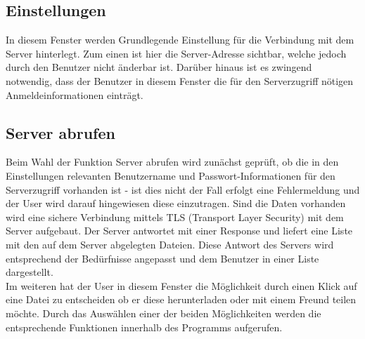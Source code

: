 \documentclass[10pt, a4paper,headsepline]{scrreprt}
\begin{document}
\subsection{Einstellungen}
In diesem Fenster werden Grundlegende Einstellung für die Verbindung mit dem Server hinterlegt. Zum einen ist hier die Server-Adresse sichtbar, welche jedoch durch den Benutzer nicht änderbar ist. Darüber hinaus ist es zwingend notwendig, dass der Benutzer in diesem Fenster die für den Serverzugriff nötigen Anmeldeinformationen einträgt.


\subsection{Server abrufen}
Beim Wahl der Funktion Server abrufen wird zunächst geprüft, ob die in den Einstellungen relevanten Benutzername und Passwort-Informationen für den Serverzugriff vorhanden ist - ist dies nicht der Fall erfolgt eine Fehlermeldung und der User wird darauf hingewiesen diese einzutragen. Sind die Daten vorhanden wird eine sichere Verbindung mittels TLS (Transport Layer Security) mit dem Server aufgebaut. Der Server antwortet mit einer Response und liefert eine Liste mit den auf dem Server abgelegten Dateien. Diese Antwort des Servers wird entsprechend der Bedürfnisse angepasst und dem Benutzer in einer Liste dargestellt. \\
Im weiteren hat der User in diesem Fenster die Möglichkeit durch einen Klick auf eine Datei zu entscheiden ob er diese herunterladen oder mit einem Freund teilen möchte. Durch das Auswählen einer der beiden Möglichkeiten werden die entsprechende Funktionen innerhalb des Programms aufgerufen.
\end{document}
